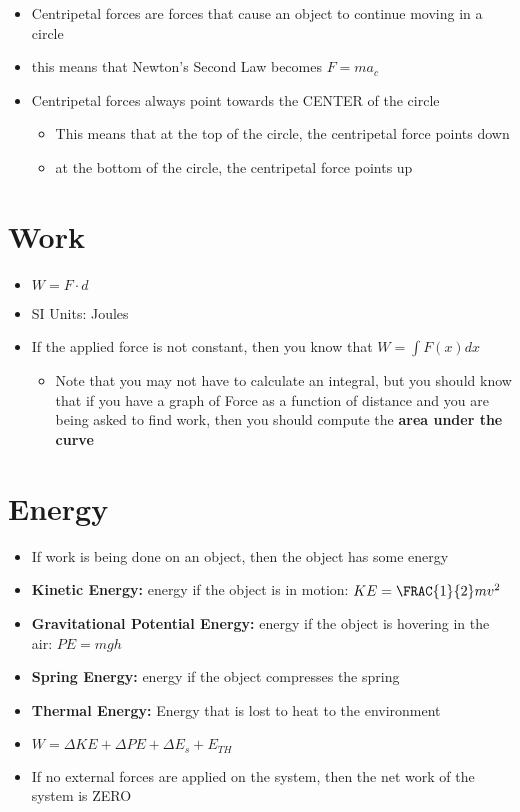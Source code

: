 \documentclass{package/notes}
\begin{document}
\begin{itemize}
    \item Centripetal forces are forces that cause an object to continue moving in a circle
    \item this means that Newton’s Second Law becomes $F=ma_c$
    \item Centripetal forces always point towards the CENTER of the circle
    \begin{itemize}
        \item This means that at the top of the circle, the centripetal force points down
        \item at the bottom of the circle, the centripetal force points up
    \end{itemize}
\end{itemize}


\section{Work}

\begin{itemize}
    \item $W = F \cdot d$
    \item SI Units: Joules
    \item If the applied force is not constant, then you know that $W = \int F(x)dx$
    \begin{itemize}
        \item Note that you may not have to calculate an integral, but you should know that if you have a graph of Force as a function of distance and you are being asked to find work, then you should compute the \textbf{area under the curve}
    \end{itemize}
\end{itemize}


\section{Energy}

\begin{itemize}
    \item If work is being done on an object, then the object has some energy
    \item \textbf{Kinetic Energy:} energy if the object is in motion: $KE = \FRAC{1}{2}mv^2$
    \item \textbf{Gravitational Potential Energy:} energy if the object is hovering in the air: $PE = mgh$
    \item \textbf{Spring Energy:} energy if the object compresses the spring
    \item \textbf{Thermal Energy:} Energy that is lost to heat to the environment
    \item $W = \Delta KE + \Delta PE + \Delta E_s + E_{TH}$
    \item If no external forces are applied on the system, then the net work of the system is ZERO
\end{itemize}
\end{document}
